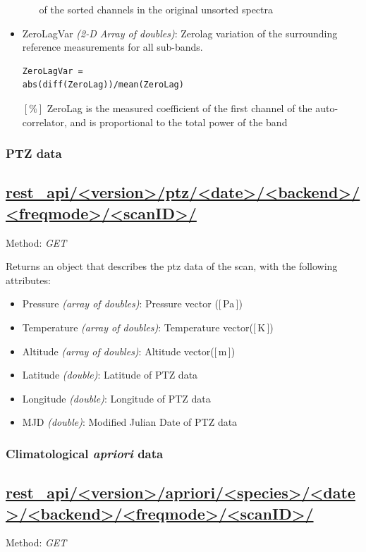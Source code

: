 \begin{itemize}
\begin{itemize}
                       of the sorted channels in the original unsorted spectra
  \end{itemize} 
  \item ZeroLagVar \emph{(2-D Array of doubles)}: Zerolag variation of the surrounding reference measurements for all sub-bands.
                       \begin{verbatim}ZeroLagVar =
abs(diff(ZeroLag))/mean(ZeroLag)\end{verbatim} \([\%]\) 
                        ZeroLag is the measured coefficient of the first channel of the auto-correlator,
                        and is proportional to the total power of the band
\end{itemize}



\subsubsection{PTZ data}
\subsection*{\url{rest_api/<version>/ptz/<date>/<backend>/<freqmode>/<scanID>/}}
Method: \emph{GET}

Returns an object that describes the ptz data of the scan,
with the following attributes:

\begin{itemize}
    \item Pressure \emph{(array of doubles)}: Pressure vector ([\,Pa\,])
    \item Temperature \emph{(array of doubles)}: Temperature vector([\,K\,])
    \item Altitude \emph{(array of doubles)}:  Altitude vector([\,m\,])
    \item Latitude \emph{(double)}: Latitude of PTZ data
    \item Longitude \emph{(double)}: Longitude of PTZ data
    \item MJD \emph{(double)}: Modified Julian Date of PTZ data

\end{itemize}

\subsubsection{Climatological \textit{apriori} data}
\subsection*{\url{rest_api/<version>/apriori/<species>/<date>/<backend>/<freqmode>/<scanID>/}}
Method: \emph{GET}

